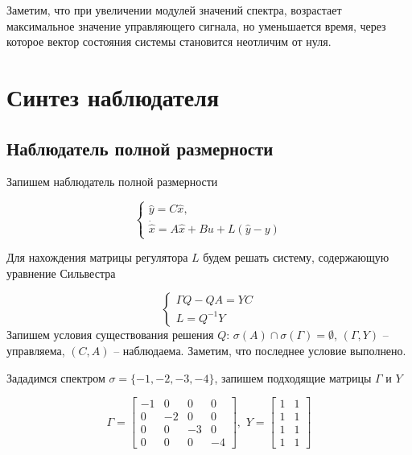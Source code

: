 Заметим, что при увеличении модулей значений спектра, возрастает максимальное значение управляющего сигнала, но уменьшается время, через которое вектор состояния системы становится неотличим от нуля.

\section{Синтез наблюдателя}

\subsection{Наблюдатель полной размерности}
Запишем наблюдатель полной размерности

\begin{equation}
    \begin{cases}
        \hat{y} = C \hat{x},\\
        \dot{\hat{x}} = A \hat{x} + Bu + L( \hat{y} - y)
    \end{cases}
\end{equation}


Для нахождения матрицы регулятора $L$ будем решать систему, содержающую уравнение Сильвестра

\begin{equation}
    \label{3_sil_obs}
    \begin{cases}
        \Gamma Q - Q A = YC\\
        L = Q^{-1}Y
    \end{cases}
\end{equation}
Запишем условия существования решения $Q$: $\sigma(A) \cap \sigma(\Gamma) = \emptyset$, $(\Gamma,Y)$ -- управляема, $(C, A)$ -- наблюдаема. Заметим, что последнее условие выполнено. 

Зададимся спектром $\sigma = \{ -1, -2, -3, -4  \}$, запишем подходящие матрицы $\Gamma$ и $Y$

\begin{equation}
\Gamma=
    \begin{bmatrix}
    -1	&0	&0	&0\\
0	&-2	&0	&0\\
0	&0&	-3	&0\\
0	&0	&0	&-4
\end{bmatrix}, \, \, 
Y  = \begin{bmatrix}
    1 & 1\\
    1 & 1\\
    1 & 1\\
    1 & 1
\end{bmatrix}
\end{equation}

